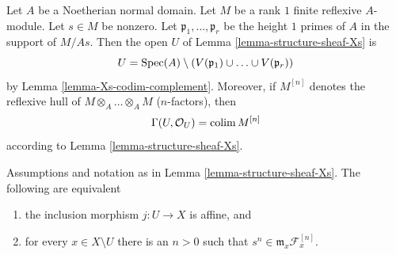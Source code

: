 \begin{remark}
\label{remark-structure-sheaf-Xs}
Let $A$ be a Noetherian normal domain. Let $M$ be a rank $1$ finite reflexive
$A$-module. Let $s \in M$ be nonzero. Let $\mathfrak p_1, \ldots, \mathfrak p_r$
be the height $1$ primes of $A$ in the support of $M/As$.
Then the open $U$ of Lemma \ref{lemma-structure-sheaf-Xs} is
$$
U = \mathop{\mathrm{Spec}}(A) \setminus
\left(V(\mathfrak p_1) \cup \ldots \cup V(\mathfrak p_r)\right)
$$
by Lemma \ref{lemma-Xs-codim-complement}. Moreover, if $M^{[n]}$
denotes the reflexive hull of $M \otimes_A \ldots \otimes_A M$
($n$-factors), then
$$
\Gamma(U, \mathcal{O}_U) = \mathop{\mathrm{colim}}\nolimits M^{[n]}
$$
according to Lemma \ref{lemma-structure-sheaf-Xs}.
\end{remark}

\begin{lemma}
\label{lemma-affine-Xs}
Assumptions and notation as in Lemma \ref{lemma-structure-sheaf-Xs}.
The following are equivalent
\begin{enumerate}
\item the inclusion morphism $j : U \to X$ is affine, and
\item for every $x \in X \setminus U$ there is an $n > 0$
such that $s^n \in \mathfrak m_x \mathcal{F}^{[n]}_x$.
\end{enumerate}
\end{lemma}

